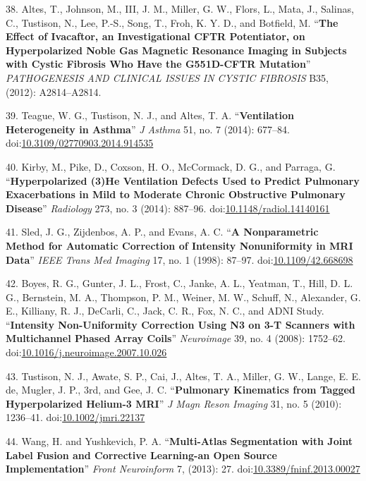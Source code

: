 \documentclass[11pt,]{article}
\begin{document}
38. Altes, T., Johnson, M., III, J. M., Miller, G. W., Flors, L., Mata,
J., Salinas, C., Tustison, N., Lee, P.-S., Song, T., Froh, K. Y. D., and
Botfield, M. ``\textbf{The Effect of Ivacaftor, an Investigational CFTR
Potentiator, on Hyperpolarized Noble Gas Magnetic Resonance Imaging in
Subjects with Cystic Fibrosis Who Have the G551D-CFTR Mutation}''
\emph{PATHOGENESIS AND CLINICAL ISSUES IN CYSTIC FIBROSIS} B35, (2012):
A2814--A2814.

39. Teague, W. G., Tustison, N. J., and Altes, T. A.
``\textbf{Ventilation Heterogeneity in Asthma}'' \emph{J Asthma} 51, no.
7 (2014): 677--84.
doi:\href{http://dx.doi.org/10.3109/02770903.2014.914535}{10.3109/02770903.2014.914535}

40. Kirby, M., Pike, D., Coxson, H. O., McCormack, D. G., and Parraga,
G. ``\textbf{Hyperpolarized (3)He Ventilation Defects Used to Predict
Pulmonary Exacerbations in Mild to Moderate Chronic Obstructive
Pulmonary Disease}'' \emph{Radiology} 273, no. 3 (2014): 887--96.
doi:\href{http://dx.doi.org/10.1148/radiol.14140161}{10.1148/radiol.14140161}

41. Sled, J. G., Zijdenbos, A. P., and Evans, A. C. ``\textbf{A
Nonparametric Method for Automatic Correction of Intensity Nonuniformity
in MRI Data}'' \emph{IEEE Trans Med Imaging} 17, no. 1 (1998): 87--97.
doi:\href{http://dx.doi.org/10.1109/42.668698}{10.1109/42.668698}

42. Boyes, R. G., Gunter, J. L., Frost, C., Janke, A. L., Yeatman, T.,
Hill, D. L. G., Bernstein, M. A., Thompson, P. M., Weiner, M. W.,
Schuff, N., Alexander, G. E., Killiany, R. J., DeCarli, C., Jack, C. R.,
Fox, N. C., and ADNI Study. ``\textbf{Intensity Non-Uniformity
Correction Using N3 on 3-T Scanners with Multichannel Phased Array
Coils}'' \emph{Neuroimage} 39, no. 4 (2008): 1752--62.
doi:\href{http://dx.doi.org/10.1016/j.neuroimage.2007.10.026}{10.1016/j.neuroimage.2007.10.026}

43. Tustison, N. J., Awate, S. P., Cai, J., Altes, T. A., Miller, G. W.,
Lange, E. E. de, Mugler, J. P., 3rd, and Gee, J. C. ``\textbf{Pulmonary
Kinematics from Tagged Hyperpolarized Helium-3 MRI}'' \emph{J Magn Reson
Imaging} 31, no. 5 (2010): 1236--41.
doi:\href{http://dx.doi.org/10.1002/jmri.22137}{10.1002/jmri.22137}

44. Wang, H. and Yushkevich, P. A. ``\textbf{Multi-Atlas Segmentation
with Joint Label Fusion and Corrective Learning-an Open Source
Implementation}'' \emph{Front Neuroinform} 7, (2013): 27.
doi:\href{http://dx.doi.org/10.3389/fninf.2013.00027}{10.3389/fninf.2013.00027}
\end{document}
